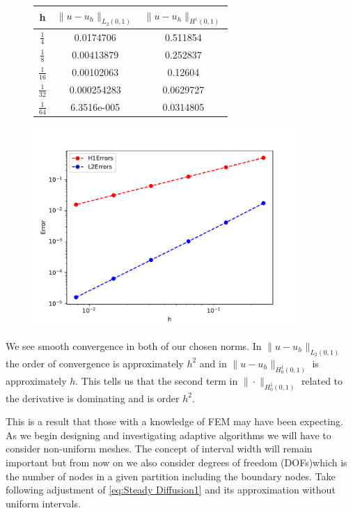 \documentclass{uonmathreport}
\theoremstyle{definition}
\theoremstyle{problem}
\theoremstyle{theorem}
\begin{document}
\begin{figure}[h!]
\begin{minipage}{0.48\hsize}
\begin{tabular}{ccc}
    \hline
     h & $\|u-u_h\|_{L_2(0,1)}$ & $\|u-u_h\|_{H^1(0,1)}$   \\ \hline
     $\tfrac{1}{4}$ & 0.0174706 &  0.511854   \\
     $\tfrac{1}{8}$ & 0.00413879 &  0.252837   \\
     $\tfrac{1}{16}$ & 0.00102063 &  0.12604   \\
	 $\tfrac{1}{32}$ & 0.000254283 &  0.0629727  \\
     $\tfrac{1}{64}$ & 6.3516e-005 &  0.0314805   \\

    \hline
  \end{tabular}
  \end{minipage}
  \hfill
    \begin{minipage}{0.48\hsize}
  \includegraphics[width=0.9\textwidth]{EllipticPDE2Convergences.pdf}
  \label{fig:c}
\end{minipage}
    \end{figure}
    
\vspace{6mm}

We see smooth convergence in both of our chosen norms. In $\|u-u_h\|_{L_2(0,1)}$ the order of convergence is approximately $h^2$  and in $\|u-u_h\|_{H^1_0(0,1)}$ is approximately $h$. This tells us that the second term in $\|\cdot\|_{H^1_0(0,1)}$ related to the derivative is dominating and is order $h^2$.

This is a result that those with a knowledge of FEM may have been expecting. As we begin designing and investigating adaptive algorithms we will have to consider non-uniform meshes. The concept of interval width will remain important but from now on we also consider degrees of freedom (DOFs)which is the number of nodes in a given partition including the boundary nodes. Take following adjustment of \ref{eq:Steady Diffusion1} and its approximation without uniform intervals.
\end{document}
